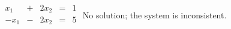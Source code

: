 {$\begin{array}{ccccc}
x_1&+&2x_2&=&1\\
-x_1&-&2x_2&=&5\\
\end{array}$}
{No solution; the system is inconsistent.}